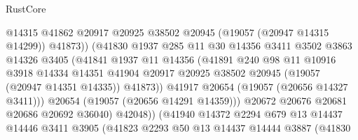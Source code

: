 \begin{lexlean}{RustCore}
\begin{coremodule}
                                  @14315
                                  @41862
                                  @20917
                                  @20925
                                  @38502
                                  @20945
                                  (@19057 (@20947 @14315 @14299))
                                  @41873))
                              (@41830
                                @1937
                                @285
                                @11
                                @30
                                @14356
                                @3411
                                @3502
                                @3863
                                @14326
                                @3405
                                (@41841
                                  @1937
                                  @11
                                  @14356
                                  (@41891
                                    @240
                                    @98
                                    @11
                                    @10916
                                    @3918
                                    @14334
                                    @14351
                                    @41904
                                    @20917
                                    @20925
                                    @38502
                                    @20945
                                    (@19057 (@20947 @14351 @14335))
                                    @41873))
                                @41917
                                @20654
                                (@19057 (@20656 @14327 @3411)))
                              @20654
                              (@19057 (@20656 @14291 @14359)))
                            @20672
                            @20676
                            @20681
                            @20686
                            @20692
                            @36040)
                          @42048))
                      (@41940
                        @14372
                        @2294
                        @679
                        @13
                        @14437
                        @14446
                        @3411
                        @3905
                        (@41823
                          @2293
                          @50
                          @13
                          @14437
                          @14444
                          @3887
                          (@41830

\end{coremodule}
\end{lexlean}
